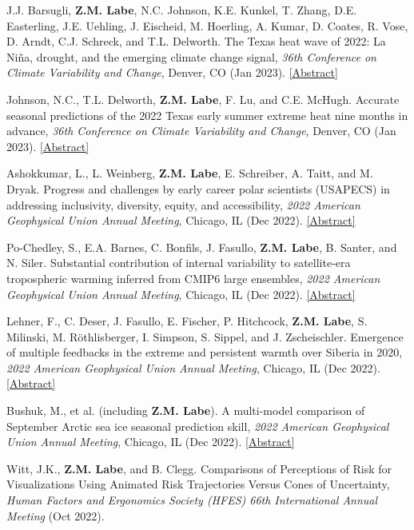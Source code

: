 \documentclass[margin,line,palatino,courier,10pt]{res}
\begin{document}
\begin{resume}
\begin{etaremune}[leftmargin=0in,topsep=0in,parsep=0in]
\item J.J. Barsugli, \textbf{Z.M. Labe}, N.C. Johnson, K.E. Kunkel, T. Zhang, D.E. Easterling, J.E. Uehling, J. Eischeid, M. Hoerling, A. Kumar, D. Coates, R. Vose, D. Arndt, C.J. Schreck, and T.L. Delworth. The Texas heat wave of 2022: La Niña, drought, and the emerging climate change signal, \textit{36th Conference on Climate Variability and Change}, Denver, CO (Jan 2023). \href{https://ams.confex.com/ams/103ANNUAL/meetingapp.cgi/Paper/421815}{[Abstract]}
\item Johnson, N.C., T.L. Delworth, \textbf{Z.M. Labe}, F. Lu, and C.E. McHugh. Accurate seasonal predictions of the 2022 Texas early summer extreme heat nine months in advance, \textit{36th Conference on Climate Variability and Change}, Denver, CO (Jan 2023). \href{https://ams.confex.com/ams/103ANNUAL/meetingapp.cgi/Paper/418044}{[Abstract]}
\item Ashokkumar, L., L. Weinberg, \textbf{Z.M. Labe}, E. Schreiber, A. Taitt, and M. Dryak. Progress and challenges by early career polar scientists (USAPECS) in addressing inclusivity, diversity, equity, and accessibility, \textit{2022 American Geophysical Union Annual Meeting}, Chicago, IL (Dec 2022). \href{https://agu.confex.com/agu/fm22/meetingapp.cgi/Paper/1192493}{[Abstract]}
\item Po-Chedley, S., E.A. Barnes, C. Bonfils, J. Fasullo, \textbf{Z.M. Labe}, B. Santer, and N. Siler. Substantial contribution of internal variability to satellite-era tropospheric warming inferred from CMIP6 large ensembles, \textit{2022 American Geophysical Union Annual Meeting}, Chicago, IL (Dec 2022). \href{https://agu.confex.com/agu/fm22/meetingapp.cgi/Paper/1095614}{[Abstract]}
\item Lehner, F., C. Deser, J. Fasullo, E. Fischer, P. Hitchcock, \textbf{Z.M. Labe}, S. Milinski, M. Röthlisberger, I. Simpson, S. Sippel, and J. Zscheischler. Emergence of multiple feedbacks in the extreme and persistent warmth over Siberia in 2020, \textit{2022 American Geophysical Union Annual Meeting}, Chicago, IL (Dec 2022). \href{https://agu.confex.com/agu/fm22/meetingapp.cgi/Paper/1190729}{[Abstract]}
\item Bushuk, M., et al. (including \textbf{Z.M. Labe}). A multi-model comparison of September Arctic sea ice seasonal prediction skill, \textit{2022 American Geophysical Union Annual Meeting}, Chicago, IL (Dec 2022). \href{https://agu.confex.com/agu/fm22/meetingapp.cgi/Paper/1179488}{[Abstract]}
\item Witt, J.K., \textbf{Z.M. Labe}, and B. Clegg. Comparisons of Perceptions of Risk for Visualizations Using Animated Risk Trajectories Versus Cones of Uncertainty, \textit{Human Factors and Ergonomics Society (HFES) 66th International Annual Meeting} (Oct 2022).

\end{etaremune}
\end{resume}
\end{document}
